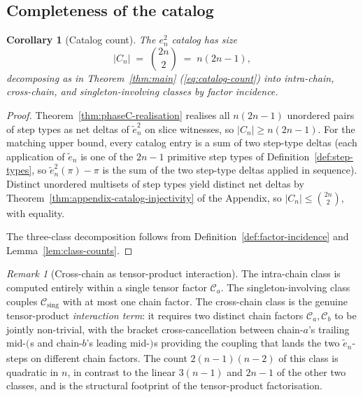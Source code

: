 \documentclass[11pt]{article}
\newtheorem{corollary}[theorem]{Corollary}
\theoremstyle{definition}
\theoremstyle{remark}
\newtheorem{remark}[theorem]{Remark}
\newcommand{\Cmid}{\mathcal{C}}
\newcommand{\Csing}{\mathcal{C}_{\mathrm{sing}}}
\newcommand{\labr}[1]{{)}_{#1}}
\newcommand{\labl}[1]{{(}_{#1}}
\begin{document}
\subsection{Completeness of the catalog}\label{ssec:phaseC-completeness}

\begin{corollary}[Catalog count]\label{cor:phaseC-count}
The $e_n^2$ catalog has size
\[
|C_n| \;=\; \binom{2n}{2} \;=\; n(2n - 1),
\]
decomposing as in Theorem~\ref{thm:main} (\ref{eq:catalog-count}) into intra-chain,
cross-chain, and singleton-involving classes by factor incidence.
\end{corollary}

\begin{proof}
Theorem~\ref{thm:phaseC-realisation} realises all $n(2n - 1)$ unordered pairs of
step types as net deltas of $\tilde e_n^2$ on slice witnesses, so $|C_n| \geq
n(2n - 1)$. For the matching upper bound, every catalog entry is a sum of two
step-type deltas (each application of $\tilde e_n$ is one of the $2n - 1$ primitive
step types of Definition~\ref{def:step-types}, so $\tilde e_n^2(\pi) - \pi$ is
the sum of the two step-type deltas applied in sequence). Distinct unordered
multisets of step types yield distinct net deltas by
Theorem~\ref{thm:appendix-catalog-injectivity} of the Appendix, so
$|C_n| \leq \binom{2n}{2}$, with equality.

The three-class decomposition follows from
Definition~\ref{def:factor-incidence} and Lemma~\ref{lem:class-counts}.
\end{proof}

\begin{remark}[Cross-chain as tensor-product interaction]\label{rmk:cross-chain-interaction}
The intra-chain class is computed entirely within a single tensor factor
$\Cmid_a$. The singleton-involving class couples $\Csing$ with at most one chain
factor. The cross-chain class is the genuine tensor-product \emph{interaction
term}: it requires two distinct chain factors $\Cmid_a, \Cmid_b$ to be jointly
non-trivial, with the bracket cross-cancellation between chain-$a$'s trailing
mid-$\labl{}$s and chain-$b$'s leading mid-$\labr{}$s providing the coupling
that lands the two $\tilde e_n$-steps on different chain factors. The count
$2(n-1)(n-2)$ of this class is quadratic in $n$, in contrast to the linear
$3(n-1)$ and $2n - 1$ of the other two classes, and is the structural footprint
of the tensor-product factorisation.
\end{remark}
\end{document}
